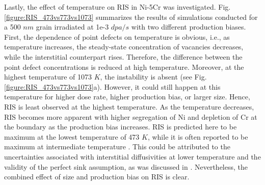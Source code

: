 \documentclass[utf8]{frontiersSCNS} %
\begin{document}
Lastly, the effect of temperature on RIS in Ni-5Cr was investigated. Fig. \ref{figure:RIS_473vs773vs1073} summarizes the results of simulations conducted for a 500 $nm$ grain irradiated at 1e-3 $dpa/s$ with two different production biases. First, the dependence of point defects on temperature is obvious, i.e., as temperature increases, the steady-state concentration of vacancies decreases, while the interstitial counterpart rises. Therefore, the difference between the point defect concentrations is reduced at high temperature. Moreover, at the highest temperature of 1073 $K$,  
the instability is absent (see Fig. \ref{figure:RIS_473vs773vs1073}a). However, it could still happen at this temperature for higher dose rate, higher production bias, or larger size. Hence, RIS is least observed at the highest temperature. As the temperature decreases, RIS becomes more apparent with higher segregation of Ni and depletion of Cr at the boundary as the production bias increases. RIS is predicted here to be maximum at the lowest temperature of 473 $K$, while it is often reported to be maximum at intermediate temperature \citep{barnard_ab_2014,barr_grain_2015}. This could be attributed to the uncertainties associated with interstitial diffusivities at lower temperature and the validity of the perfect sink assumption, as was discussed in \citep{barnard_ab_2014}. Nevertheless, the combined effect of size and production bias on RIS is clear.
\end{document}
